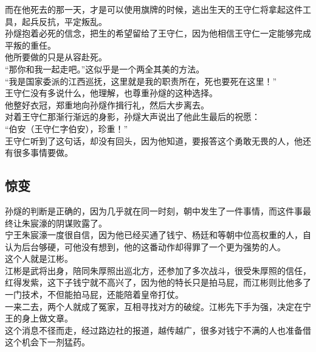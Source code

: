 \begin{multicols}{\theparacolNo}
而在他死去的那一天，才是可以使用旗牌的时候，逃出生天的王守仁将拿起这件工具，起兵反抗，平定叛乱。\\

孙燧抱着必死的信念，把生的希望留给了王守仁，因为他相信王守仁一定能够完成平叛的重任。\\

他所要做的只是从容赴死。\\

“那你和我一起走吧。”这似乎是一个两全其美的方法。\\

“我是国家委派的江西巡抚，这里就是我的职责所在，死也要死在这里！”\\

王守仁没有多说什么，他理解，也尊重孙燧的这种选择。\\

他整好衣冠，郑重地向孙燧作揖行礼，然后大步离去。\\

对着王守仁那渐行渐远的身影，孙燧大声说出了他此生最后的祝愿：\\

“伯安（王守仁字伯安），珍重！”\\

王守仁听到了这句话，却没有回头，因为他知道，要报答这个勇敢无畏的人，他还有很多事情要做。\\

\subsection{惊变}
孙燧的判断是正确的，因为几乎就在同一时刻，朝中发生了一件事情，而这件事最终让朱宸濠的阴谋败露了。\\

宁王朱宸濠一度很自信，因为他已经买通了钱宁、杨廷和等朝中位高权重的人，自认为后台够硬，可他没有想到，他的这番动作却得罪了一个更为强势的人。\\

这个人就是江彬。\\

江彬是武将出身，陪同朱厚照出巡北方，还参加了多次战斗，很受朱厚照的信任，红得发紫，这下子钱宁就不高兴了，因为他的特长只是拍马屁，而江彬则比他多了一门技术，不但能拍马屁，还能陪着皇帝打仗。\\

一来二去，两个人就成了冤家，互相寻找对方的破绽。江彬先下手为强，决定在宁王的身上做文章。\\

这个消息不径而走，经过路边社的报道，越传越广，很多对钱宁不满的人也准备借这个机会下一剂猛药。\\


\end{multicols}
